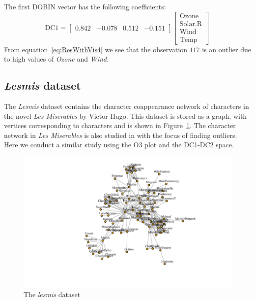 \documentclass[11pt]{article}
\begin{document}
The first DOBIN vector has the following coefficients:
\begin{equation}\label{eq:ResWithVis4}
    \text{DC1} = \begin{bmatrix}
    0.842 & -0.078 &  0.512 & -0.151   
    \end{bmatrix}
    \begin{bmatrix}
    \text{Ozone} \\
    \text{Solar.R} \\
    \text{Wind} \\
    \text{Temp} 
    \end{bmatrix} \, 
\end{equation}
From equation~\eqref{eq:ResWithVis4} we see that the observation $117$ is an outlier due to high values of \textit{Ozone} and \textit{Wind}. 

\subsection{\textit{Lesmis} dataset}\label{sec:ResWithVis5}
The \textit{Lesmis} dataset \citep{sombrero} contains the character coappearance network of characters in the novel \textit{Les Miserables} by Victor Hugo. This dataset is stored as a graph, with vertices corresponding to characters and is shown in Figure~\ref{fig:lesmisgraph}. The character network in \textit{Les Miserables} is also studied in \cite{wilkinson2017visualizing} with the focus of finding outliers. Here we conduct a similar study using the O3 plot and the DC1-DC2 space. \\

\begin{figure}[!t]
	\centering
	\includegraphics{lesmis.pdf}
	\caption{The \textit{lesmis} dataset }
	\label{fig:lesmisgraph}
\end{figure}
\end{document}

